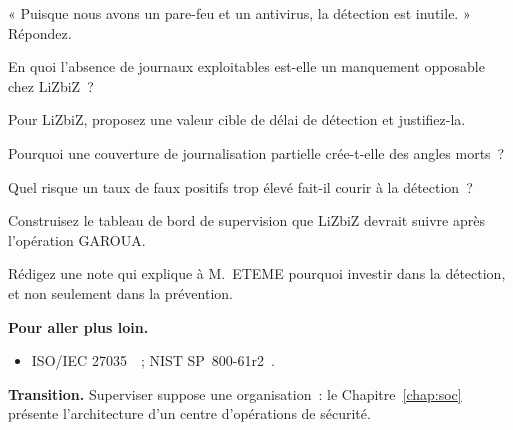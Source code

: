 \begin{boxexo}[title={\ding{45}\quad Exercice~1.4. Le filet \niveaumoyen}]
« Puisque nous avons un pare-feu et un antivirus, la détection est inutile. »
Répondez.
\end{boxexo}

\begin{boxexo}[title={\ding{45}\quad Exercice~1.5. Obligation \niveaumoyen}]
En quoi l'absence de journaux exploitables est-elle un manquement opposable
chez LiZbiZ~?
\end{boxexo}

\begin{boxexo}[title={\ding{45}\quad Exercice~1.6. Indicateurs \niveaumoyen}]
Pour LiZbiZ, proposez une valeur cible de délai de détection et justifiez-la.
\end{boxexo}

\begin{boxexo}[title={\ding{45}\quad Exercice~1.7. Couverture \niveaumoyen}]
Pourquoi une couverture de journalisation partielle crée-t-elle des angles
morts~?
\end{boxexo}

\begin{boxexo}[title={\ding{45}\quad Exercice~1.8. Faux positifs \niveaumoyen}]
Quel risque un taux de faux positifs trop élevé fait-il courir à la
détection~?
\end{boxexo}

\begin{boxexo}[title={\ding{45}\quad Exercice~1.9. Tableau de bord \niveauexpert}]
Construisez le tableau de bord de supervision que LiZbiZ devrait suivre après
l'opération GAROUA.
\end{boxexo}

\begin{boxexo}[title={\ding{45}\quad Exercice~1.10. Note à la direction \niveauexpert}]
Rédigez une note qui explique à M.~ETEME pourquoi investir dans la détection,
et non seulement dans la prévention.
\end{boxexo}

\bigskip

\begin{boxinfo}
\textbf{Pour aller plus loin.}
\begin{itemize}
    \item ISO/IEC 27035~\cite{iso27035}~; NIST SP~800-61r2~\cite{nist80061r2}.
\end{itemize}
\end{boxinfo}

\begin{boxinfo}
\textbf{Transition.} Superviser suppose une organisation~: le
Chapitre~\ref{chap:soc} présente l'architecture d'un centre d'opérations de
sécurité.
\end{boxinfo}

